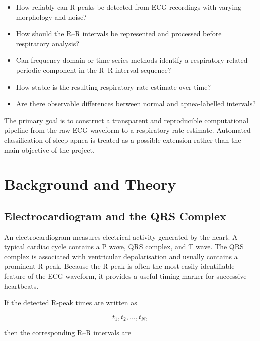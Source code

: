\begin{itemize}
    \item How reliably can R peaks be detected from ECG recordings with
    varying morphology and noise?

    \item How should the R--R intervals be represented and processed before
    respiratory analysis?

    \item Can frequency-domain or time-series methods identify a
    respiratory-related periodic component in the R--R interval sequence?

    \item How stable is the resulting respiratory-rate estimate over time?

    \item Are there observable differences between normal and
    apnea-labelled intervals?
\end{itemize}

The primary goal is to construct a transparent and reproducible computational
pipeline from the raw ECG waveform to a respiratory-rate estimate. Automated
classification of sleep apnea is treated as a possible extension rather than
the main objective of the project.


\section{Background and Theory}
\label{sec:background}

\subsection{Electrocardiogram and the QRS Complex}
\label{subsec:ecg}

An electrocardiogram measures electrical activity generated by the heart.
A typical cardiac cycle contains a P wave, QRS complex, and T wave. The QRS
complex is associated with ventricular depolarisation and usually contains a
prominent R peak. Because the R peak is often the most easily identifiable
feature of the ECG waveform, it provides a useful timing marker for
successive heartbeats.

If the detected R-peak times are written as

\begin{equation}
t_1, t_2, \ldots, t_N,
\end{equation}

then the corresponding R--R intervals are

